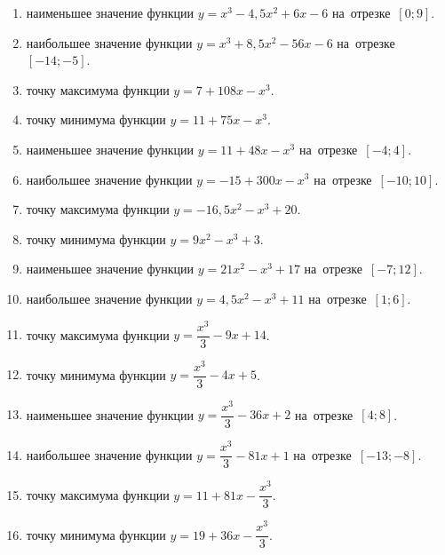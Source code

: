 \documentclass[a4paper,10pt]{article}
\begin{document}
\begin{enumerate}
\item {} наименьшее значение функции $y=x^3 -4,5x^2+6x-6$ на~отрезке~$\left[0;9\right]$.

\item {} наибольшее значение функции $y=x^3 +8,5x^2-56x-6$ на~отрезке~$\left[-14;-5\right]$.

\item {} точку максимума функции $y=7+108x-x^3$.

\item {} точку минимума функции $y=11+75x-x^3$.

\item {} наименьшее значение функции $y=11+48x-x^3$ на~отрезке~$\left[-4;4\right]$.

\item {} наибольшее значение функции $y=-15+300x-x^3$ на~отрезке~$\left[-10;10\right]$.

\item {} точку максимума функции $y=-16,5x^2-x^3+20$.

\item {} точку минимума функции $y=9x^2-x^3+3$.

\item {} наименьшее значение функции $y=21x^2-x^3+17$ на~отрезке~$\left[-7;12\right]$.

\item {} наибольшее значение функции $y=4,5x^2-x^3+11$ на~отрезке~$\left[1;6\right]$.

\item {} точку максимума функции $y=\dfrac{x^3}{3} -9x+14$.

\item {} точку минимума функции $y=\dfrac{x^3}{3} -4x+5$.

\item {} наименьшее значение функции $y=\dfrac{x^3}{3} -36x+2$ на~отрезке~$\left[4;8\right]$.

\item {} наибольшее значение функции $y=\dfrac{x^3}{3} -81x+1$ на~отрезке~$\left[-13;-8\right]$.

\item {} точку максимума функции $y=11 +81x-\dfrac{x^3}{3}$.

\item {} точку минимума функции $y=19 +36x-\dfrac{x^3}{3}$.


\end{enumerate}
\end{document}
